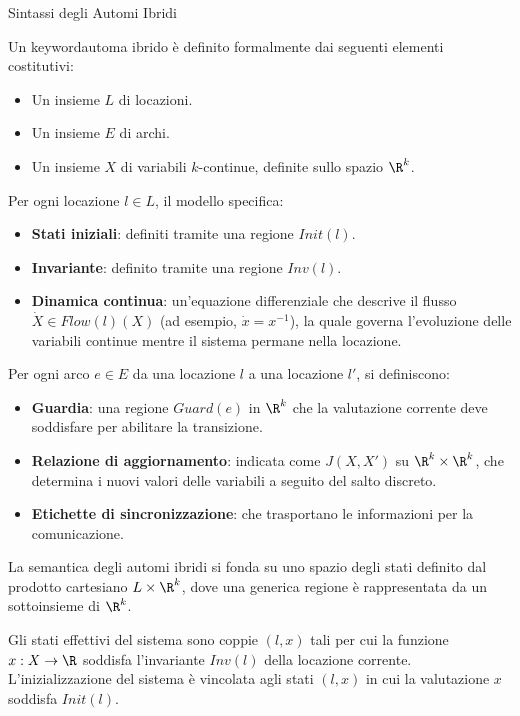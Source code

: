 \begin{definition}{Sintassi degli Automi Ibridi}

  Un keyword{automa ibrido} è definito formalmente dai seguenti elementi costitutivi:
  \begin{itemize}
    \item Un insieme \(L\) di locazioni.
    \item Un insieme \(E\) di archi.
    \item Un insieme \(X\) di variabili \(k\)-continue, definite sullo spazio \(\R^k\).
  \end{itemize}
  
  Per ogni locazione \(l \in L\), il modello specifica:
  \begin{itemize}
    \item \textbf{Stati iniziali}: definiti tramite una regione \(Init(l)\).
    \item \textbf{Invariante}: definito tramite una regione \(Inv(l)\).
    \item \textbf{Dinamica continua}: un'equazione differenziale che descrive il flusso \(\dot{X} \in Flow(l)(X)\) (ad esempio, \(\dot{x} = x^{-1}\)), la quale governa l'evoluzione delle variabili continue mentre il sistema permane nella locazione.
  \end{itemize}
  
  Per ogni arco \(e \in E\) da una locazione \(l\) a una locazione \(l'\), si definiscono:
  \begin{itemize}
    \item \textbf{Guardia}: una regione \(Guard(e)\) in \(\R^k\) che la valutazione corrente deve soddisfare per abilitare la transizione.
    \item \textbf{Relazione di aggiornamento}: indicata come \(J(X,X')\) su \(\R^k \times \R^k\), che determina i nuovi valori delle variabili a seguito del salto discreto.
    \item \textbf{Etichette di sincronizzazione}: che trasportano le informazioni per la comunicazione.
  \end{itemize}
\end{definition}

La semantica degli automi ibridi si fonda su uno spazio degli stati definito dal prodotto cartesiano \(L \times \R^k\), dove una generica regione è rappresentata da un sottoinsieme di \(\R^k\).

Gli stati effettivi del sistema sono coppie \((l,x)\) tali per cui la funzione \(x: X \to \R\) soddisfa l'invariante \(Inv(l)\) della locazione corrente. L'inizializzazione del sistema è vincolata agli stati \((l,x)\) in cui la valutazione \(x\) soddisfa \(Init(l)\).

